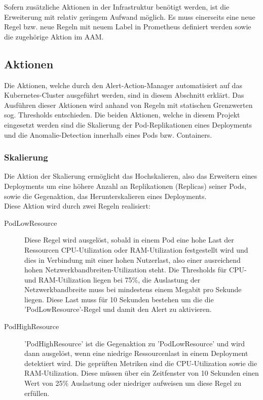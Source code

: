 \documentclass[a4paper,10pt]{scrartcl}
\begin{document}
Sofern zusätzliche Aktionen in der Infrastruktur benötigt werden, ist die Erweiterung mit relativ geringem Aufwand möglich. Es muss einerseits eine neue Regel bzw. neue Regeln mit neuem Label in Prometheus definiert werden sowie die zugehörige Aktion im AAM.

\subsection{Aktionen}

Die Aktionen, welche durch den Alert-Action-Manager automatisiert auf das Kubernetes-Cluster ausgeführt werden, sind in diesem Abschnitt erklärt. Das Ausführen dieser Aktionen wird anhand von Regeln mit statischen Grenzwerten sog. Thresholds entschieden.
Die beiden Aktionen, welche in diesem Projekt eingesetzt werden sind die Skalierung der Pod-Replikationen eines Deployments und die Anomalie-Detection innerhalb eines Pods bzw. Containers.

\subsubsection{Skalierung}

Die Aktion der Skalierung ermöglicht das Hochskalieren, also das Erweitern eines Deployments um eine höhere Anzahl an Replikationen (Replicas) seiner Pods, sowie die Gegenaktion, das Herunterskalieren eines Deployments.\\
Diese Aktion wird durch zwei Regeln realisiert:

\begin{description}
\item[PodLowResource]

Diese Regel wird ausgelöst, sobald in einem Pod eine hohe Last der Ressourcen CPU-Utilization oder RAM-Utilization festgestellt wird und dies in Verbindung mit einer hohen Nutzerlast, also einer ausreichend hohen Netzwerkbandbreiten-Utilization steht. Die Thresholds für CPU- und RAM-Utilization liegen bei 75\%, die Auslastung der Netzwerkbandbreite muss bei mindestens einem Megabit pro Sekunde liegen. Diese Last muss für 10 Sekunden bestehen um die die 'PodLowResource'-Regel und damit den Alert zu aktivieren.

\item[PodHighResource]

'PodHighResource' ist die Gegenaktion zu 'PodLowResource' und wird dann ausgelöst, wenn 
eine niedrige Ressourcenlast in einem Deployment detektiert wird. Die geprüften Metriken sind die CPU-Utilization sowie die RAM-Utilization. Diese müssen über ein Zeitfenster von 10 Sekunden einen Wert von 25\% Auslastung oder niedriger aufweisen um diese Regel zu erfüllen.

\end{description}
\end{document}
